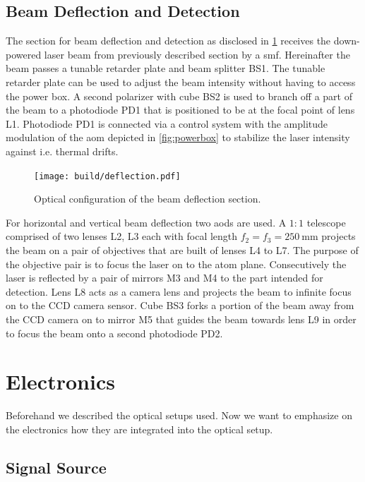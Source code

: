 \subsection{Beam Deflection and Detection}
\label{sec:deflection}

The section for beam deflection and detection as disclosed in
\cref{fig:deflection} receives the down-powered laser beam from previously
described section by a \gls{smf}. Hereinafter the beam passes a tunable
retarder plate and beam splitter BS1. The tunable retarder plate can be used
to adjust the beam intensity without having to access the power box.
A second polarizer with cube BS2 is used to branch off a part of the beam
to a photodiode PD1 that is positioned to be at the focal point of lens L1.
Photodiode PD1 is connected via a control system with the amplitude
modulation of the \gls{aom} depicted in \cref{fig:powerbox} to stabilize
the laser intensity against i.e. thermal drifts.

\begin{figure}[h]
  \centering
  \texttt{[image: build/deflection.pdf]}
  \caption{Optical configuration of the beam deflection section.}
  \label{fig:deflection}
\end{figure}

For horizontal and vertical beam deflection two \gls{aod}s are used. A $1:1$
telescope comprised of two lenses L2, L3
each with focal length $f_2=f_3=\SI{250}{\milli\meter}$ projects the beam
on a pair of objectives that are built of lenses L4 to L7. The purpose of the
objective pair is to focus the laser on to the atom plane.
Consecutively the laser is reflected by a pair of mirrors M3 and M4 to the
part intended for detection. Lens L8 acts as a camera lens and projects the
beam to infinite focus on to the CCD camera sensor. Cube BS3 forks a portion
of the beam away from the CCD camera on to mirror M5 that guides the beam
towards lens L9 in order to focus the beam onto a second photodiode PD2.

\section{Electronics}

Beforehand we described the optical setups used. Now we want to emphasize
on the electronics how they are integrated into the optical setup.

\subsection{Signal Source}

